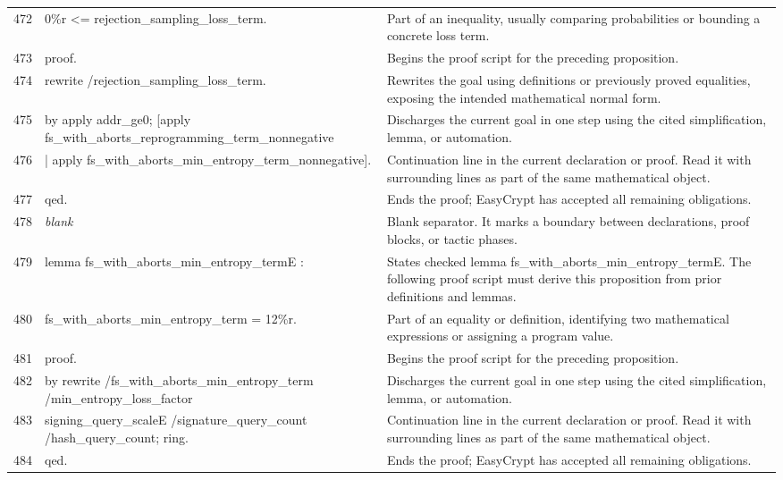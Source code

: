 \documentclass[10pt]{article}
\begin{document}
\begin{longtable}{r L{0.53\textwidth} L{0.37\textwidth}}
472 & {\ttfamily\scriptsize   0\%r <= rejection\_sampling\_loss\_term.} & Part of an inequality, usually comparing probabilities or bounding a concrete loss term. \\
473 & {\ttfamily\scriptsize proof.} & Begins the proof script for the preceding proposition. \\
474 & {\ttfamily\scriptsize rewrite /rejection\_sampling\_loss\_term.} & Rewrites the goal using definitions or previously proved equalities, exposing the intended mathematical normal form. \\
475 & {\ttfamily\scriptsize by apply addr\_ge0; [apply fs\_with\_aborts\_reprogramming\_term\_nonnegative} & Discharges the current goal in one step using the cited simplification, lemma, or automation. \\
476 & {\ttfamily\scriptsize                   | apply fs\_with\_aborts\_min\_entropy\_term\_nonnegative].} & Continuation line in the current declaration or proof.  Read it with surrounding lines as part of the same mathematical object. \\
477 & {\ttfamily\scriptsize qed.} & Ends the proof; EasyCrypt has accepted all remaining obligations. \\
478 & {\ttfamily\scriptsize \emph{blank}} & Blank separator.  It marks a boundary between declarations, proof blocks, or tactic phases. \\
479 & {\ttfamily\scriptsize lemma fs\_with\_aborts\_min\_entropy\_termE :} & States checked lemma fs\_with\_aborts\_min\_entropy\_termE.  The following proof script must derive this proposition from prior definitions and lemmas. \\
480 & {\ttfamily\scriptsize   fs\_with\_aborts\_min\_entropy\_term = 12\%r.} & Part of an equality or definition, identifying two mathematical expressions or assigning a program value. \\
481 & {\ttfamily\scriptsize proof.} & Begins the proof script for the preceding proposition. \\
482 & {\ttfamily\scriptsize by rewrite /fs\_with\_aborts\_min\_entropy\_term /min\_entropy\_loss\_factor} & Discharges the current goal in one step using the cited simplification, lemma, or automation. \\
483 & {\ttfamily\scriptsize            signing\_query\_scaleE /signature\_query\_count /hash\_query\_count; ring.} & Continuation line in the current declaration or proof.  Read it with surrounding lines as part of the same mathematical object. \\
484 & {\ttfamily\scriptsize qed.} & Ends the proof; EasyCrypt has accepted all remaining obligations. \\

\end{longtable}
\end{document}
